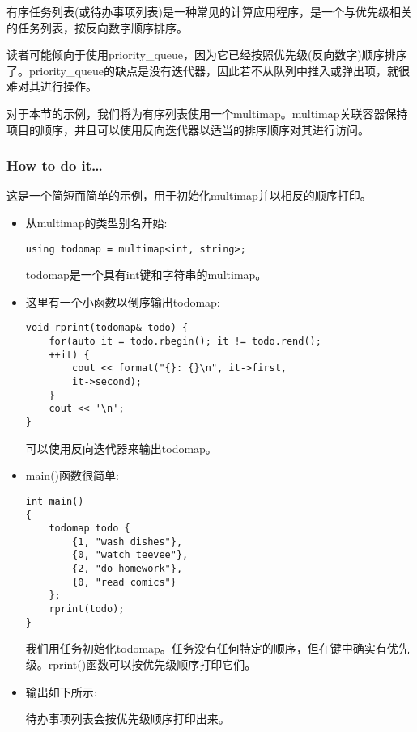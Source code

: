 
有序任务列表(或待办事项列表)是一种常见的计算应用程序，是一个与优先级相关的任务列表，按反向数字顺序排序。

读者可能倾向于使用priority\_queue，因为它已经按照优先级(反向数字)顺序排序了。priority\_queue的缺点是没有迭代器，因此若不从队列中推入或弹出项，就很难对其进行操作。

对于本节的示例，我们将为有序列表使用一个multimap。multimap关联容器保持项目的顺序，并且可以使用反向迭代器以适当的排序顺序对其进行访问。

\subsubsection{How to do it…}

这是一个简短而简单的示例，用于初始化multimap并以相反的顺序打印。

\begin{itemize}
\item 
从multimap的类型别名开始:

\begin{lstlisting}[style=styleCXX]
using todomap = multimap<int, string>;
\end{lstlisting}

todomap是一个具有int键和字符串的multimap。

\item 
这里有一个小函数以倒序输出todomap:

\begin{lstlisting}[style=styleCXX]
void rprint(todomap& todo) {
	for(auto it = todo.rbegin(); it != todo.rend();
	++it) {
		cout << format("{}: {}\n", it->first,
		it->second);
	}
	cout << '\n';
}
\end{lstlisting}

可以使用反向迭代器来输出todomap。

\item 
main()函数很简单:

\begin{lstlisting}[style=styleCXX]
int main()
{
	todomap todo {
		{1, "wash dishes"},
		{0, "watch teevee"},
		{2, "do homework"},
		{0, "read comics"}
	};
	rprint(todo);
}
\end{lstlisting}

我们用任务初始化todomap。任务没有任何特定的顺序，但在键中确实有优先级。rprint()函数可以按优先级顺序打印它们。

\item 
输出如下所示:


待办事项列表会按优先级顺序打印出来。

\end{itemize}



